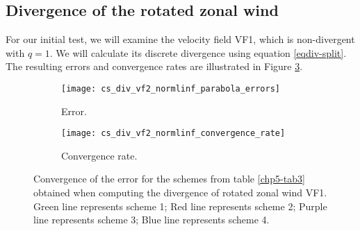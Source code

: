 \subsection{Divergence of the rotated zonal wind}
For our initial test, we will examine the velocity field VF1, which is non-divergent with $q=1$.
We will calculate its discrete divergence using equation \eqref{eqdiv-split}.
The resulting errors and convergence rates are illustrated in Figure \ref{chp5-error-div}.
\begin{figure}[!htb]
	\centering
	\begin{subfigure}{0.42\textwidth}
		\centering
		\texttt{[image: cs\_div\_vf2\_normlinf\_parabola\_errors]}
		\caption{Error.\label{chp5-errordiv}}
	\end{subfigure}
	\begin{subfigure}{0.42\textwidth}
		\centering
		\texttt{[image: cs\_div\_vf2\_normlinf\_convergence\_rate]}
		\caption{Convergence rate.\label{chp5-crdiv}}
	\end{subfigure}
	\caption{Convergence of the error for the schemes from table \ref{chp5-tab3} obtained when computing the divergence of rotated zonal wind VF1.
	Green line represents scheme 1;
	Red line represents scheme 2;
	Purple line represents scheme 3;
	Blue line represents scheme 4.
	\label{chp5-error-div}}
\end{figure}

